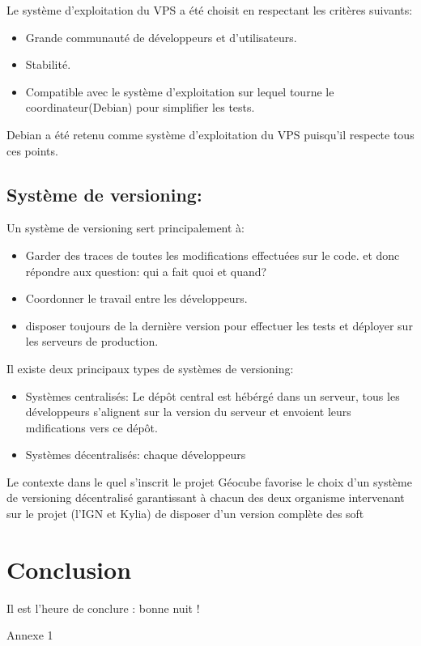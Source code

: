 \documentclass{themeensg}
\begin{document}
Le système d'exploitation du VPS a été choisit en respectant les critères suivants:
\begin{itemize}
\item Grande communauté de développeurs et d'utilisateurs.
\item Stabilité.
\item Compatible avec le système d'exploitation sur lequel tourne le coordinateur(Debian) pour simplifier les tests.
\end{itemize}

Debian a été retenu comme système d'exploitation du VPS puisqu'il respecte tous ces points.

\section{Système de versioning:}
Un système de versioning sert principalement à:

\begin{itemize}
\item Garder des traces de toutes les modifications effectuées sur le code. et donc répondre aux question: qui a fait quoi et quand?
\item Coordonner le travail entre les développeurs.
\item disposer toujours de la dernière version pour effectuer les tests et déployer sur les serveurs de production.
\end{itemize}

Il existe deux principaux types de systèmes de versioning:
\begin{itemize}
\item Systèmes centralisés: Le dépôt central est hébérgé dans un serveur, tous les développeurs s'alignent sur la version du serveur et envoient leurs mdifications vers ce dépôt.
\item Systèmes décentralisés: chaque développeurs
\end{itemize}

Le contexte dans le quel s'inscrit le projet Géocube favorise le choix d'un système de versioning décentralisé garantissant à chacun des deux organisme intervenant sur le projet (l'IGN et Kylia) de disposer d'un version complète des soft

\newevenpage
\chapter*{Conclusion}
  \vspace{1.5cm}
Il est l'heure de conclure : bonne nuit !


\newevenpage
\nocite{*}



\newevenpage
\begin{appendices} 
\label{beginappendices}
\label{annexekalman}
Annexe 1

\end{appendices} 
\end{document}
